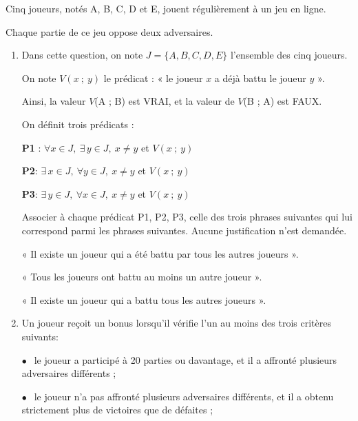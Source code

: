 \begin{exercice}

    Cinq joueurs, notés A, B, C, D et E, jouent régulièrement à un jeu en ligne.

    Chaque partie de ce jeu oppose deux adversaires.

    \begin{enumerate}
        \item Dans cette question, on note $J = \lbrace A, B, C, D, E\rbrace$ l'ensemble des cinq joueurs.

              On note $V(x~;~y)$ le prédicat : « le joueur $x$ a déjà battu le joueur $y$ ».

              Ainsi, la valeur $V$(A ; B) est VRAI, et la valeur de $V$(B ; A) est FAUX.

              \smallskip

              On définit trois prédicats :


              \textbf{P1} : $\forall x \in J,\: \exists\, y \in J,\: x \neq y$  et $V(x~;~y)$

              \textbf{P2}: $\exists\, x \in J,\: \forall y \in J,\: x \neq y$  et $V(x~;~y)$

              \textbf{P3}: $\exists\, y \in J,\: \forall x \in J,\: x \neq y$  et $V(x~;~y)$

              \smallskip

              Associer à chaque prédicat P1, P2, P3, celle des trois phrases suivantes qui lui correspond parmi
              les phrases suivantes. Aucune justification n'est demandée.

              « Il existe un joueur qui a été battu par tous les autres joueurs ».

              « Tous les joueurs ont battu au moins un autre joueur  ».

              « Il existe un joueur qui a battu tous les autres joueurs  ».

        \item Un joueur reçoit un bonus lorsqu'il vérifie l'un au moins des trois critères suivants:

              $\bullet~~$ le joueur a participé à 20 parties ou davantage, et il a affronté plusieurs adversaires
              différents ;

              $\bullet~~$  le joueur n'a pas affronté plusieurs adversaires différents, et il a obtenu strictement plus de
              victoires que de défaites ;


\end{enumerate}
\end{exercice}
